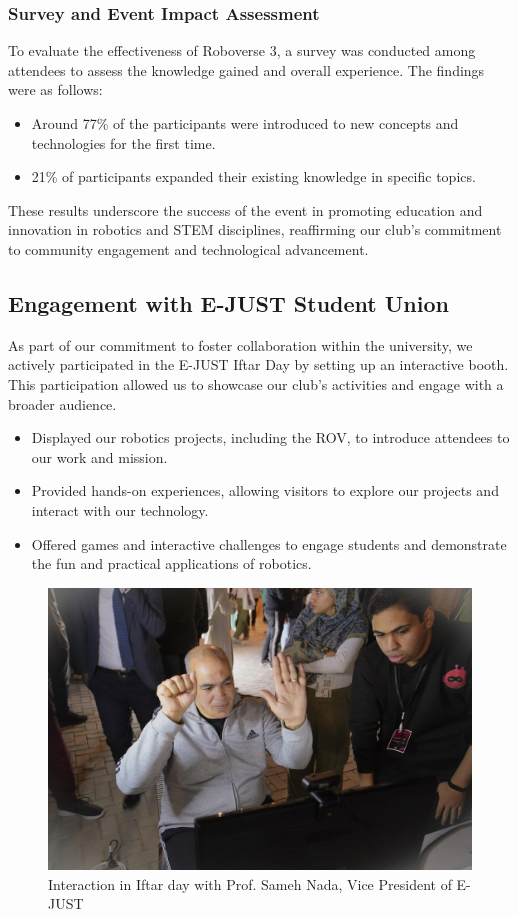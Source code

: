 \documentclass[11pt, twocolumn]{article}
\begin{document}
\subsubsection{Survey and Event Impact Assessment}
To evaluate the effectiveness of Roboverse 3, a survey was conducted among attendees to assess the knowledge gained and overall experience. The findings were as follows:
\begin{itemize}
    \item Around 77\% of the participants were introduced to new concepts and technologies for the first time.
    \item 21\% of participants expanded their existing knowledge in specific topics.
\end{itemize}
These results underscore the success of the event in promoting education and innovation in robotics and STEM disciplines, reaffirming our club’s commitment to community engagement and technological advancement.

\subsection{Engagement with E-JUST Student Union}
As part of our commitment to foster collaboration within the university, we actively participated in the E-JUST Iftar Day by setting up an interactive booth. This participation allowed us to showcase our club's activities and engage with a broader audience.


\begin{itemize}
    \item Displayed our robotics projects, including the ROV, to introduce attendees to our work and mission.
    \item Provided hands-on experiences, allowing visitors to explore our projects and interact with our technology.
    \item Offered games and interactive challenges to engage students and demonstrate the fun and practical applications of robotics.
\end{itemize}
\begin{figure}[h]
            \centering
            \includegraphics[width=0.75\linewidth]{Images/EJUST Iftar.jpg}
            \caption{Interaction in Iftar day with Prof. Sameh Nada, Vice President of E-JUST}
            \label{fig:iftar}
                \end{figure}
\end{document}
